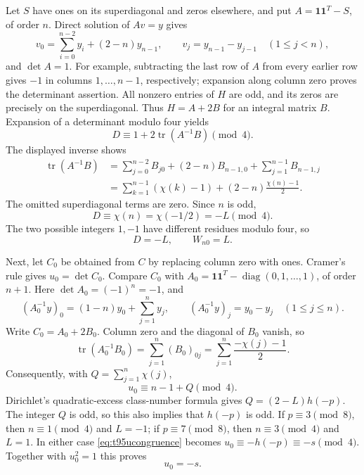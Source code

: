 \documentclass[11pt,a4paper]{article}
\theoremstyle{definition}
\theoremstyle{remark}
\begin{document}
Let $S$ have ones on its superdiagonal and zeros elsewhere, and put
$A=\mathbf1\mathbf1^T-S$, of order $n$. Direct solution of $Av=y$ gives
\[
 v_0=\sum_{i=0}^{n-2}y_i+(2-n)y_{n-1},\qquad
 v_j=y_{n-1}-y_{j-1}\quad(1\le j<n),
\]
and $\det A=1$. For example, subtracting the last row of $A$ from every
earlier row gives $-1$ in columns $1,\ldots,n-1$, respectively; expansion
along column zero proves the determinant assertion.
All nonzero entries of $H$ are odd, and its zeros are precisely on the
superdiagonal. Thus $H=A+2B$ for an integral matrix $B$. Expansion of a
determinant modulo four yields
\[
 D\equiv1+2\operatorname{tr}(A^{-1}B)\pmod4.
\]
The displayed inverse shows
\begin{align*}
 \operatorname{tr}(A^{-1}B)
 &=\sum_{j=0}^{n-2}B_{j0}+(2-n)B_{n-1,0}
      +\sum_{j=1}^{n-1}B_{n-1,j}\\
 &=\sum_{k=1}^{n-1}(\chi(k)-1)
       +(2-n)\frac{\chi(n)-1}{2}.
\end{align*}
The omitted superdiagonal terms are zero. Since $n$ is odd,
\[
 D\equiv\chi(n)=\chi(-1/2)=-L\pmod4.
\]
The two possible integers $1,-1$ have different residues modulo four,
so
\begin{equation}\label{eq:t95signD}
 D=-L,\qquad W_{n0}=L.
\end{equation}

Next, let $C_0$ be obtained from $C$ by replacing column zero with ones.
Cramer's rule gives $u_0=\det C_0$. Compare $C_0$ with
$A_0=\mathbf1\mathbf1^T-\operatorname{diag}(0,1,\ldots,1)$, of order
$n+1$. Here $\det A_0=(-1)^n=-1$, and
\[
 (A_0^{-1}y)_0=(1-n)y_0+\sum_{j=1}^n y_j,\qquad
 (A_0^{-1}y)_j=y_0-y_j\quad(1\le j\le n).
\]
Write $C_0=A_0+2B_0$. Column zero and the diagonal of $B_0$ vanish,
so
\[
 \operatorname{tr}(A_0^{-1}B_0)
 =\sum_{j=1}^n(B_0)_{0j}
 =\sum_{j=1}^n\frac{-\chi(j)-1}{2}.
\]
Consequently, with $Q=\sum_{j=1}^n\chi(j)$,
\begin{equation}\label{eq:t95ucongruence}
 u_0\equiv n-1+Q\pmod4.
\end{equation}
Dirichlet's quadratic-excess class-number formula \cite{t95davenport} gives
$Q=(2-L)h(-p)$. The integer $Q$ is odd, so this also implies that
$h(-p)$ is odd. If $p\equiv3\pmod8$, then $n\equiv1\pmod4$ and
$L=-1$; if $p\equiv7\pmod8$, then $n\equiv3\pmod4$ and $L=1$.
In either case \eqref{eq:t95ucongruence} becomes
$u_0\equiv-h(-p)\equiv-s\pmod4$. Together with $u_0^2=1$ this proves
\begin{equation}\label{eq:t95signu}
 u_0=-s.
\end{equation}
\end{document}
